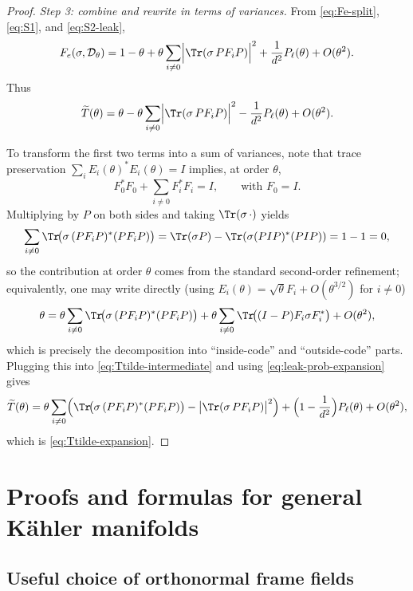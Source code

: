 \documentclass[12pt]{article}
\theoremstyle{definition} %
\theoremstyle{plain} %
\theoremstyle{remark} %
\theoremstyle{underline}
\begin{document}
\begin{proof}
\smallskip
\noindent\emph{Step 3: combine and rewrite in terms of variances.}
From \eqref{eq:Fe-split}, \eqref{eq:S1}, and \eqref{eq:S2-leak},
\[
F_e(\sigma,\mathcal D_\theta)
=
1-\theta
+\theta\sum_{i\neq 0}\Bigl|\Tr(\sigma\,PF_iP)\Bigr|^2
+\frac{1}{d^2}P_\ell(\theta)
+O(\theta^2).
\]
Thus
\begin{equation}\label{eq:Ttilde-intermediate}
\widetilde T(\theta)
=
\theta
-\theta\sum_{i\neq 0}\Bigl|\Tr(\sigma\,PF_iP)\Bigr|^2
-\frac{1}{d^2}P_\ell(\theta)
+O(\theta^2).
\end{equation}

To transform the first two terms into a sum of variances, note that trace preservation
$\sum_i E_i(\theta)^*E_i(\theta)=I$ implies, at order $\theta$,
\[
F_0^*F_0+\sum_{i\neq 0}F_i^*F_i=I,\qquad \text{with }F_0=I.
\]
Multiplying by $P$ on both sides and taking $\Tr(\sigma\,\cdot)$ yields
\[
\sum_{i\neq 0}\Tr\!\bigl(\sigma\,(PF_iP)^*(PF_iP)\bigr)
=
\Tr(\sigma P)-\Tr(\sigma (PI P)^*(PI P))
=
1-1
=0,
\]
so the contribution at order $\theta$ comes from the standard second-order refinement; equivalently, one may write directly (using $E_i(\theta)=\sqrt\theta F_i+O(\theta^{3/2})$ for $i\neq 0$)
\[
\theta
=
\theta\sum_{i\neq 0}\Tr\!\bigl(\sigma\,(PF_iP)^*(PF_iP)\bigr)
+\theta\sum_{i\neq 0}\Tr\!\bigl((I-P)F_i\sigma F_i^*\bigr)
+O(\theta^2),
\]
which is precisely the decomposition into ``inside-code'' and ``outside-code'' parts. Plugging this into \eqref{eq:Ttilde-intermediate} and using \eqref{eq:leak-prob-expansion} gives
\[
\widetilde T(\theta)
=
\theta\sum_{i\neq 0}\Bigl(
\Tr\!\bigl(\sigma\,(PF_iP)^*(PF_iP)\bigr)
-
\bigl|\Tr(\sigma\,PF_iP)\bigr|^2
\Bigr)
+
\Bigl(1-\frac{1}{d^2}\Bigr)P_\ell(\theta)
+O(\theta^2),
\]
which is \eqref{eq:Ttilde-expansion}.
\end{proof}




\section{Proofs and formulas for general K\"ahler manifolds}


\subsection{Useful choice of orthonormal frame fields}
\label{complex orthonormal}
\end{document}

